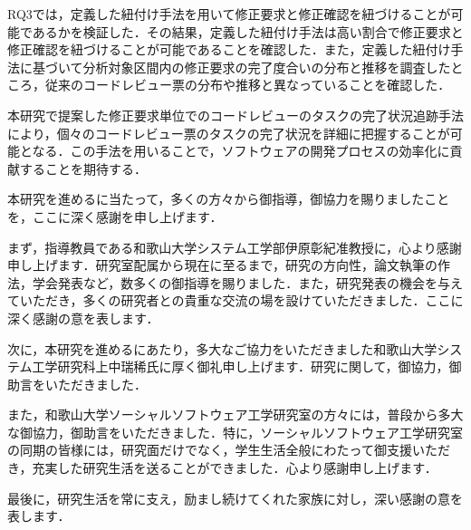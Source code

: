 \documentclass[11pt]{jreport}
\begin{document}
RQ3では，定義した紐付け手法を用いて修正要求と修正確認を紐づけることが可能であるかを検証した．その結果，定義した紐付け手法は高い割合で修正要求と修正確認を紐づけることが可能であることを確認した．また，定義した紐付け手法に基づいて分析対象区間内の修正要求の完了度合いの分布と推移を調査したところ，従来のコードレビュー票の分布や推移と異なっていることを確認した．

本研究で提案した修正要求単位でのコードレビューのタスクの完了状況追跡手法により，個々のコードレビュー票のタスクの完了状況を詳細に把握することが可能となる．この手法を用いることで，ソフトウェアの開発プロセスの効率化に貢献することを期待する．

\begin{acknowledgements}
本研究を進めるに当たって，多くの方々から御指導，御協力を賜りましたことを，ここに深く感謝を申し上げます．

まず，指導教員である和歌山大学システム工学部伊原彰紀准教授に，心より感謝申し上げます．研究室配属から現在に至るまで，研究の方向性，論文執筆の作法，学会発表など，数多くの御指導を賜りました．また，研究発表の機会を与えていただき，多くの研究者との貴重な交流の場を設けていただきました．ここに深く感謝の意を表します．

次に，本研究を進めるにあたり，多大なご協力をいただきました和歌山大学システム工学研究科上中瑞稀氏に厚く御礼申し上げます．研究に関して，御協力，御助言をいただきました．

また，和歌山大学ソーシャルソフトウェア工学研究室の方々には，普段から多大な御協力，御助言をいただきました．特に，ソーシャルソフトウェア工学研究室の同期の皆様には，研究面だけでなく，学生生活全般にわたって御支援いただき，充実した研究生活を送ることができました．心より感謝申し上げます．

最後に，研究生活を常に支え，励まし続けてくれた家族に対し，深い感謝の意を表します．
\end{acknowledgements}



\end{document}
